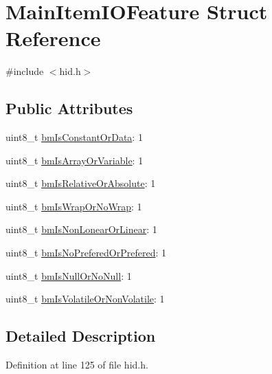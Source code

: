 \hypertarget{struct_main_item_i_o_feature}{\section{\-Main\-Item\-I\-O\-Feature \-Struct \-Reference}
\label{struct_main_item_i_o_feature}
}


{\ttfamily \#include $<$hid.\-h$>$}

\subsection*{\-Public \-Attributes}
\begin{DoxyCompactItemize}
\item 
uint8\-\_\-t \hyperlink{struct_main_item_i_o_feature_a5d578c79399be5da63790c7396fc5336}{bm\-Is\-Constant\-Or\-Data}\-: 1
\item 
uint8\-\_\-t \hyperlink{struct_main_item_i_o_feature_adaf8eafeb85f6aff94e211601e76ee8f}{bm\-Is\-Array\-Or\-Variable}\-: 1
\item 
uint8\-\_\-t \hyperlink{struct_main_item_i_o_feature_aeb93d03989043229774d2a6832e48628}{bm\-Is\-Relative\-Or\-Absolute}\-: 1
\item 
uint8\-\_\-t \hyperlink{struct_main_item_i_o_feature_a7acdfbb4a6b53046205cccae67fa26d4}{bm\-Is\-Wrap\-Or\-No\-Wrap}\-: 1
\item 
uint8\-\_\-t \hyperlink{struct_main_item_i_o_feature_abbe00a271ed4f5200399dd2ec5d18795}{bm\-Is\-Non\-Lonear\-Or\-Linear}\-: 1
\item 
uint8\-\_\-t \hyperlink{struct_main_item_i_o_feature_afd8eca62fe742513103795799d960d01}{bm\-Is\-No\-Prefered\-Or\-Prefered}\-: 1
\item 
uint8\-\_\-t \hyperlink{struct_main_item_i_o_feature_a9673a5c3415a2f43b488aa32181b1f4c}{bm\-Is\-Null\-Or\-No\-Null}\-: 1
\item 
uint8\-\_\-t \hyperlink{struct_main_item_i_o_feature_aaa20e71b24fe2de818a85b0cbdcba33e}{bm\-Is\-Volatile\-Or\-Non\-Volatile}\-: 1
\end{DoxyCompactItemize}


\subsection{\-Detailed \-Description}


\-Definition at line 125 of file hid.\-h.



